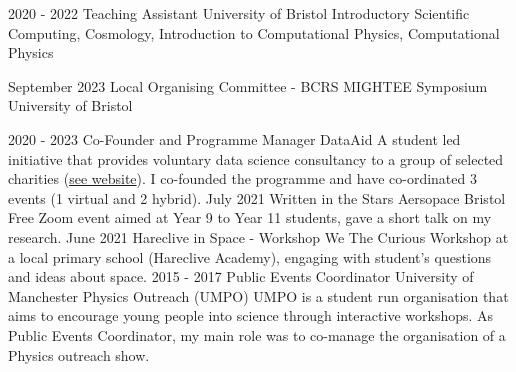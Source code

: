 \documentclass[9pt]{developercv} %
\begin{document}
\vspace{-10pt}
\begin{entrylist}
    \entry
            {2020 - 2022}
            {Teaching Assistant}
            {University of Bristol}
            {Introductory Scientific Computing, Cosmology, Introduction to Computational Physics, Computational Physics}
\end{entrylist}

\vspace{-15 pt}
\begin{entrylist}
    \entry
            {September 2023}
            {Local Organising Committee - \textnormal{BCRS MIGHTEE Symposium}}
            {University of Bristol}
            {}
\end{entrylist}

\vspace{-10 pt}
\begin{entrylist}
    \entry
		{2020 - 2023}
		{Co-Founder and Programme Manager}
		{DataAid}
		{A student led initiative that provides voluntary data science consultancy to a group of selected charities ({\href{https://cdt-aimlac.org/cdt-data-aid.html}{see website}}). I co-founded the programme and have co-ordinated 3 events (1 virtual and 2 hybrid).}
    \entry
            {July 2021}
            {Written in the Stars}
            {Aersopace Bristol}
            {Free Zoom event aimed at Year 9 to Year 11 students, gave a short talk on my research.}
    \entry
            {June 2021}
            {Hareclive in Space - Workshop}
            {We The Curious}
            {Workshop at a local primary school (Hareclive Academy), engaging with student's questions and ideas about space.}
      \entry
		{2015 - 2017}
		{Public Events Coordinator}
		{University of Manchester Physics Outreach (UMPO)}
		{UMPO is a student run organisation that aims to encourage young people into      science through interactive workshops. As Public Events Coordinator, my main    role was to co-manage the organisation of a Physics outreach show.}
\end{entrylist}
\end{document}
